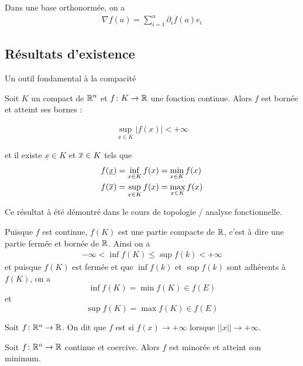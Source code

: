 \documentclass[french,a4paper,10pt]{article}
\begin{document}
	\begin{rappel}
		Dans une base orthonormée, on a
		\[\begin{aligned}
			\nabla f(a)=\sum_{i=1}^n\partial_i f(a)e_i
		\end{aligned}\]
	\end{rappel}
	
	
	\subsection{Résultats d'existence}
	
	Un outil fondamental à la compacité
	
	\begin{oc-theorem}
		Soit $K$ un compact de $\mathbb{R}^n$ et $f\colon K\to \mathbb{R}$ une fonction continue. Alors $f$ est bornée et atteint ses bornes :
		
			\[\begin{aligned}
				\sup_{x\in K}|f(x)|<+\infty
			\end{aligned}\]
		
		et il existe $\underline{x}\in K$ et $\overline{x}\in K$ tels que 
			\[\begin{aligned}
				f(\underline x)&= \inf_{x\in K}f(x)=\min_{x\in K}f(x)\\
				f(\overline{x})&= \sup_{x\in K}f(x)=\max_{x\in K}f(x)\\
			\end{aligned}\]
	\end{oc-theorem}

	\begin{myproof}
		Ce résultat à été démontré dans le cours de topologie / analyse fonctionnelle. 
		
		Puisque $f$ est continue, $f(K)$ est une partie compacte de $\mathbb{R}$, c'est à dire une partie fermée et bornée de $\mathbb{R}$. Ainsi on a
		\[\begin{aligned}
			-\infty<\inf f(K)\le \sup f(k)<+\infty
		\end{aligned}\]
		et puisque $f(K)$ est fermée et que $\inf f(k)$ et $\sup f(k)$ sont adhérents à $f(K)$, on a
			\[
				\inf f(K)=\min f(K)\in f(E)
			\]
		et 
			\[
			\sup f(K)=\max f(K)\in f(E)
			\]
	\end{myproof}
	\begin{oc-definition}
		Soit $f\colon\mathbb{R}^n\to \mathbb{R}$. On dit que $f$ est  si $f(x)\to+\infty$ lorsque $||x||\to+\infty$.
		
	\end{oc-definition}
	\begin{oc-theorem}
		Soit $f\colon\mathbb{R}^n\to\mathbb{R}$ continue et coercive. Alors $f$ est minorée et atteint son minimum.
		
	\end{oc-theorem}
\end{document}
